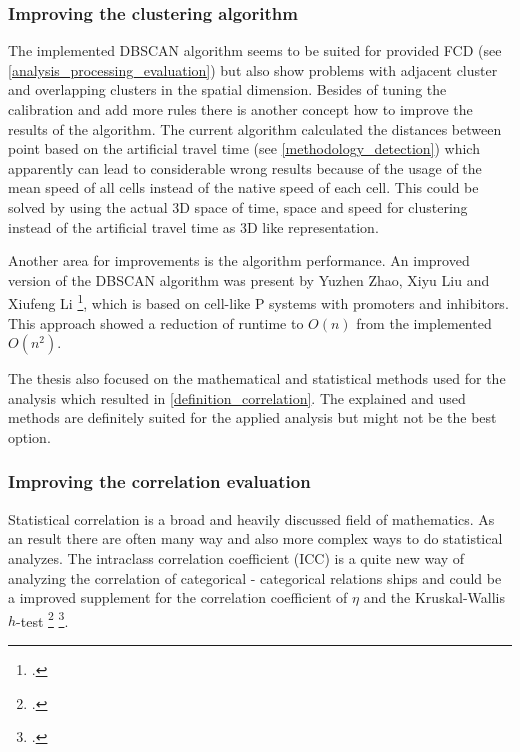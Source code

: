 \subsubsection{Improving the clustering algorithm}
The implemented DBSCAN algorithm seems to be suited for provided FCD (see \cref{analysis_processing_evaluation}) but also show problems with adjacent cluster and overlapping clusters in the spatial dimension. Besides of tuning the calibration and add more rules there is another concept how to improve the results of the algorithm. The current algorithm calculated the distances between point based on the artificial travel time (see \cref{methodology_detection}) which apparently can lead to considerable wrong results because of the usage of the mean speed of all cells instead of the native speed of each cell. This could be solved by using the actual 3D space of time, space and speed for clustering instead of the artificial travel time as 3D like representation.

Another area for improvements is the algorithm performance. An improved version of the DBSCAN algorithm was present by Yuzhen Zhao, Xiyu Liu and Xiufeng Li \footcite{https://journals.plos.org/plosone/article?id=10.1371/journal.pone.0200751}, which is based on cell-like P systems with promoters and inhibitors. This approach showed a reduction of runtime to $O(n)$ from the implemented $O(n^2)$.

\bigskip

The thesis also focused on the mathematical and statistical methods used for the analysis which resulted in \cref{definition_correlation}. The explained and used methods are definitely suited for the applied analysis but might not be the best option.

\subsubsection{Improving the correlation evaluation}
Statistical correlation is a broad and heavily discussed field of mathematics. As an result there are often many way and also more complex ways to do statistical analyzes. The intraclass correlation coefficient (ICC) is a quite new way of analyzing the correlation of categorical - categorical relations ships and could be a improved supplement for the correlation coefficient of $\eta$ and the Kruskal-Wallis $h$-test \footcite{https://stats.stackexchange.com/questions/73065/correlation-coefficient-between-a-non-dichotomous-nominal-variable-and-a-numer} \footcite{https://pingouin-stats.org/generated/pingouin.intraclass_corr.html}.

